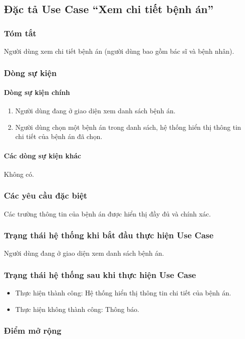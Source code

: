 \subsection{Đặc tả Use Case ``Xem chi tiết bệnh án''}

\subsubsection{Tóm tắt}
Người dùng xem chi tiết bệnh án (người dùng bao gồm bác sĩ và bệnh nhân).

\subsubsection{Dòng sự kiện}
\paragraph{\textbf{Dòng sự kiện chính}}
\begin{enumerate}
  \item Người dùng đang ở giao diện xem danh sách bệnh án.
  \item Người dùng chọn một bệnh án trong danh sách, hệ thống hiển thị thông tin chi tiết của bệnh án đã chọn.
\end{enumerate}

\paragraph{\textbf{Các dòng sự kiện khác}}
Không có.

\subsubsection{Các yêu cầu đặc biệt}
Các trường thông tin của bệnh án được hiển thị đầy đủ và chính xác.

\subsubsection{Trạng thái hệ thống khi bắt đầu thực hiện Use Case}
Người dùng đang ở giao diện xem danh sách bệnh án.

\subsubsection{Trạng thái hệ thống sau khi thực hiện Use Case}
\begin{itemize}
  \item Thực hiện thành công: Hệ thống hiển thị thông tin chi tiết của bệnh án.
  \item Thực hiện không thành công: Thông báo.
\end{itemize}

\subsubsection{Điểm mở rộng}